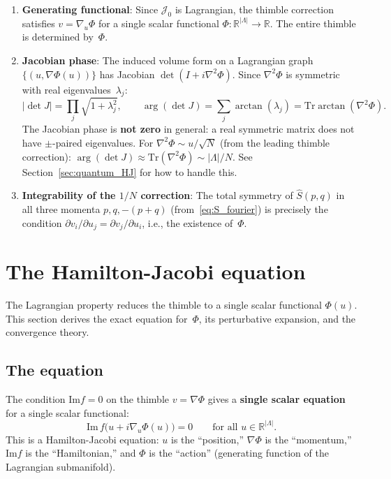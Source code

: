 \documentclass[12pt]{article}
\theoremstyle{definition}
\theoremstyle{remark}
\newcommand{\R}{\mathbb{R}}
\newcommand{\Tr}{\mathrm{Tr}}
\newcommand{\La}{\Lambda}
\newcommand{\im}{\mathrm{Im}}
\begin{document}
\begin{enumerate}
\item \textbf{Generating functional}: Since $\mathcal{J}_0$ is
  Lagrangian, the thimble correction satisfies
  $v = \nabla_u \Phi$ for a single scalar functional
  $\Phi : \R^{|\La|} \to \R$. The entire thimble is determined
  by~$\Phi$.

\item \textbf{Jacobian phase}: The induced volume form on a
  Lagrangian graph $\{(u, \nabla\Phi(u))\}$ has Jacobian
  $\det(I + i\nabla^2\Phi)$. Since $\nabla^2\Phi$ is symmetric
  with real eigenvalues~$\lambda_j$:
  \begin{equation}
    |\det J| = \prod_j\sqrt{1+\lambda_j^2}, \qquad
    \arg(\det J) = \sum_j \arctan(\lambda_j)
      = \Tr\arctan(\nabla^2\Phi).
  \end{equation}
  The Jacobian phase is \textbf{not zero} in general: a real
  symmetric matrix does not have $\pm$-paired eigenvalues.
  For $\nabla^2\Phi \sim u/\sqrt{N}$
  (from the leading thimble correction):
  $\arg(\det J) \approx \Tr(\nabla^2\Phi) \sim |\La|/N$.
  See Section~\ref{sec:quantum_HJ} for how to handle this.

\item \textbf{Integrability of the $1/N$ correction}: The total
  symmetry of $\hat{S}(p,q)$ in all three momenta $p, q, -(p{+}q)$
  (from~\eqref{eq:S_fourier}) is precisely the condition
  $\partial v_i/\partial u_j = \partial v_j/\partial u_i$, i.e.,
  the existence of~$\Phi$.
\end{enumerate}

\section{The Hamilton-Jacobi equation}
\label{sec:HJ}

The Lagrangian property reduces the thimble to a single scalar
functional $\Phi(u)$. This section derives the exact equation
for~$\Phi$, its perturbative expansion, and the convergence theory.

\subsection{The equation}

The condition $\im f = 0$ on the thimble $v = \nabla\Phi$ gives a
\textbf{single scalar equation} for a single scalar functional:
\begin{equation}\label{eq:HJ}
  \boxed{\im\,f\bigl(u + i\nabla_u\Phi(u)\bigr) = 0
    \qquad\text{for all } u \in \R^{|\La|}.}
\end{equation}
This is a Hamilton-Jacobi equation: $u$ is the ``position,''
$\nabla\Phi$ is the ``momentum,'' $\im f$ is the ``Hamiltonian,''
and $\Phi$ is the ``action'' (generating function of the
Lagrangian submanifold).
\end{document}
